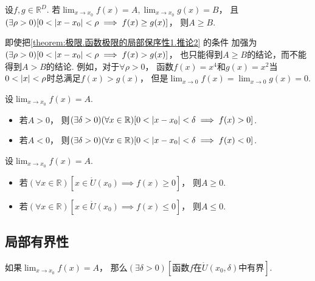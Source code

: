 \begin{corollary}\label{theorem:极限.函数极限的局部保序性1.推论2}
设\(f,g\in\mathbb{R}^D\).
若\(\lim_{x\to x_0} f(x) = A,
\lim_{x\to x_0} g(x) = B\)，
且\((\exists\rho>0)[0<\abs{x-x_0}<\rho \implies f(x) \geq g(x)]\)，
则\(A \geq B\).
\end{corollary}
\begin{remark}
即使把\cref{theorem:极限.函数极限的局部保序性1.推论2} 的条件
加强为\((\exists\rho>0)[0<\abs{x-x_0}<\rho \implies f(x) > g(x)]\)，
也只能得到\(A \geq B\)的结论，而不能得到\(A > B\)的结论.
例如，对于\(\forall\rho>0\)，
函数\(f(x) = x^4\)和\(g(x) = x^2\)当\(0<\abs{x}<\rho\)时总满足\(f(x) > g(x)\)，
但是\(\lim_{x\to0} f(x) = \lim_{x\to0} g(x) = 0\).
\end{remark}


\begin{corollary}[局部保号性]\label{theorem:极限.函数极限的局部保号性1}
设\(\lim_{x \to x_0} f(x) = A\).
\begin{itemize}
	\item 若\(A>0\)，
	则\((\exists\delta>0)
	(\forall x\in\mathbb{R})
	[0<\abs{x-x_0}<\delta \implies f(x)>0]\).
	\item 若\(A<0\)，
	则\((\exists\delta>0)
	(\forall x\in\mathbb{R})
	[0<\abs{x-x_0}<\delta \implies f(x)<0]\).
\end{itemize}
\end{corollary}

\begin{corollary}\label{theorem:极限.函数极限的局部保号性3}
设\(\lim_{x \to x_0} f(x) = A\).
\begin{itemize}
	\item 若\((\forall x\in\mathbb{R})
	[x\in\mathring{U}(x_0) \implies f(x) \geq 0]\)，
	则\(A \geq 0\).
	\item 若\((\forall x\in\mathbb{R})
	[x\in\mathring{U}(x_0) \implies f(x) \leq 0]\)，
	则\(A \leq 0\).
\end{itemize}
\end{corollary}

\subsection{局部有界性}
\begin{corollary}[局部有界性]\label{theorem:极限.函数极限的局部有界性}
如果\(\lim_{x \to x_0} f(x) = A\)，
那么\((\exists\delta>0)[\text{函数$f$在$\mathring{U}(x_0,\delta)$中有界}]\).
\end{corollary}
